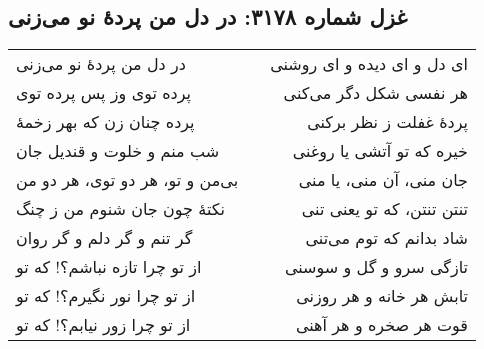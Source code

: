 \begin{center}
\section*{غزل شماره ۳۱۷۸: در دل من پردهٔ نو می‌زنی}
\label{sec:3178}
\begin{longtable}{l p{0.5cm} r}
در دل من پردهٔ نو می‌زنی
&&
ای دل و ای دیده و ای روشنی
\\
پرده توی وز پس پرده توی
&&
هر نفسی شکل دگر می‌کنی
\\
پرده چنان زن که بهر زخمهٔ
&&
پردهٔ غفلت ز نظر برکنی
\\
شب منم و خلوت و قندیل جان
&&
خیره که تو آتشی یا روغنی
\\
بی‌من و تو، هر دو توی، هر دو من
&&
جان منی، آن منی، یا منی
\\
نکتهٔ چون جان شنوم من ز چنگ
&&
تنتن تنتن، که تو یعنی تنی
\\
گر تنم و گر دلم و گر روان
&&
شاد بدانم که توم می‌تنی
\\
از تو چرا تازه نباشم؟! که تو
&&
تازگی سرو و گل و سوسنی
\\
از تو چرا نور نگیرم؟! که تو
&&
تابش هر خانه و هر روزنی
\\
از تو چرا زور نیابم؟! که تو
&&
قوت هر صخره و هر آهنی
\\
\end{longtable}
\end{center}
